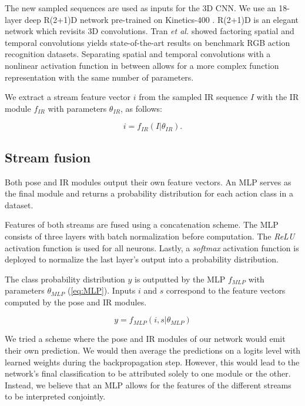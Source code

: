 \documentclass[letterpaper, 10 pt, conference]{ieeeconf}
\begin{document}
The new sampled sequences are used as inputs for the 3D CNN. We use an 18-layer deep R(2+1)D network \cite{tran2018closer} pre-trained on Kinetics-400 \cite{carreira2017quo}. R(2+1)D is an elegant network which revisits 3D convolutions. Tran \textit{et al.} showed factoring spatial and temporal convolutions yields state-of-the-art results on benchmark RGB action recognition datasets. Separating spatial and temporal convolutions with a nonlinear activation function in between allows for a more complex function representation with the same number of parameters.

We extract a stream feature vector $i$ from the sampled IR sequence $I$ with the IR module $f_{IR}$ with parameters $\theta_{IR}$, as follows:

\begin{equation}
i = f_{IR}(I|\theta_{IR}).
\end{equation}

\subsection{Stream fusion}

Both pose and IR modules output their own feature vectors. An MLP serves as the final module and returns a probability distribution for each action class in a dataset. 

Features of both streams are fused using a concatenation scheme. The MLP consists of three layers with batch normalization \cite{ioffe2015batch} before computation. The \textit{ReLU} activation function is used for all neurons. Lastly, a \textit{softmax} activation function is deployed to normalize the last layer's output into a probability distribution. 

The class probability distribution $y$ is outputted by the MLP $f_{MLP}$  with parameters $\theta_{MLP}$ (\ref{eq:MLP}). Inputs $i$ and $s$ correspond to the feature vectors computed by the pose and IR modules.

\begin{equation} \label{eq:MLP}
y = f_{MLP}(i, s|\theta_{MLP})
\end{equation}

We tried a scheme where the pose and IR modules of our network would emit their own prediction. We would then average the predictions on a logits level with learned weights during the backpropagation step. However, this would lead to the network's final classification to be attributed solely to one module or the other. Instead, we believe that an MLP allows for the features of the different streams to be interpreted conjointly. 
\end{document}
